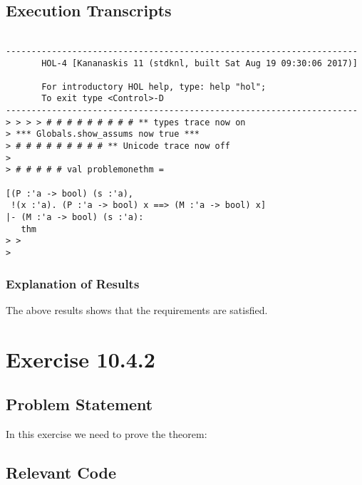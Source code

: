 \documentclass{report}
\begin{document}
\section{Execution Transcripts}
\label{sec:exec-transcr-4}

\setcounter{sessioncount}{0}
\begin{session}
  \begin{scriptsize}
\begin{verbatim}

---------------------------------------------------------------------
       HOL-4 [Kananaskis 11 (stdknl, built Sat Aug 19 09:30:06 2017)]

       For introductory HOL help, type: help "hol";
       To exit type <Control>-D
---------------------------------------------------------------------
> > > > # # # # # # # # # ** types trace now on
> *** Globals.show_assums now true ***
> # # # # # # # # # ** Unicode trace now off
> 
> # # # # # val problemonethm =
   
[(P :'a -> bool) (s :'a),
 !(x :'a). (P :'a -> bool) x ==> (M :'a -> bool) x]
|- (M :'a -> bool) (s :'a):
   thm
> > 
> 
\end{verbatim}
  \end{scriptsize}
\end{session}

\subsection{Explanation of Results}
\label{sec:explanation-results-4}
The above results shows that the requirements are satisfied.



 \chapter{Exercise 10.4.2}
 \label{cha:exercise-10.4.2}
  
 \section{Problem Statement}
 \label{sec:problem-statement-5}

In this exercise we need to prove the theorem:
\HOLTokenTurnstile{}  \HOLSymConst{\HOLTokenImp{}} \HOLSymConst{\HOLTokenNeg{}}

\section{Relevant Code}
\label{sec:relevant-code-5}

\end{document}
